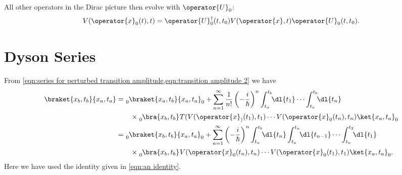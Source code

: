 \documentclass[fleqn]{NotesClass}
\newcommand*{\hermit}{\dagger}
\newcommand*{\timeorder}{T}
\begin{document}
    All other operators in the Dirac picture then evolve with \(\operator{U}_0\):
    \begin{equation}
        V(\operator{x}_0(t), t) = \operator{U}_0^\hermit (t, t_0) V(\operator{x}, t)\operator{U}_0(t, t_0).
    \end{equation}
    
    \section{Dyson Series}
    From \cref{eqn:series for perturbed transition amplitude,eqn:transition amplitude 2} we have
    \begin{align}
        \braket{x_b, t_b}{x_a, t_a} &= \tensor[_0]{\braket{x_a, t_b}{x_a, t_a}}{_0} + \sum_{n=1}^{\infty} \frac{1}{n!} \left( -\frac{i}{\hbar} \right)^n \int_{t_a}^{t_b} \!\! \dl{t_1} \dotsm \int_{t_a}^{t_b} \!\! \dl{t_n}\notag\\
        &\qquad\times \tensor[_0]{\bra{x_b, t_b}}{} \timeorder(V(\operator{x}_)(t_1), t_1) \dotsm V(\operator{x}_0(t_n), t_n) \ket{x_a, t_a}_0\\
        &= \tensor[_0]{\braket{x_b, t_b}{x_a, t_a}}{_0} + \sum_{n=1}^{\infty} \left( -\frac{i}{\hbar} \right)^{n} \int_{t_a}^{t_b} \!\! \dl{t_n} \int_{t_a}^{t_n} \!\! \dl{t_{n-1}} \dotsm \int_{t_a}^{t_2} \!\! \dl{t_1} \notag\\
        &\qquad\times \tensor[_0]{\bra{x_b, t_b}}{} V(\operator{x}_0(t_n), t_n) \dotsm V(\operator{x}_0(t_1), t_1)\ket{x_a, t_a}_0.
    \end{align}
    Here we have used the identity given in \cref{eqn:an identity}.
    
\end{document}
